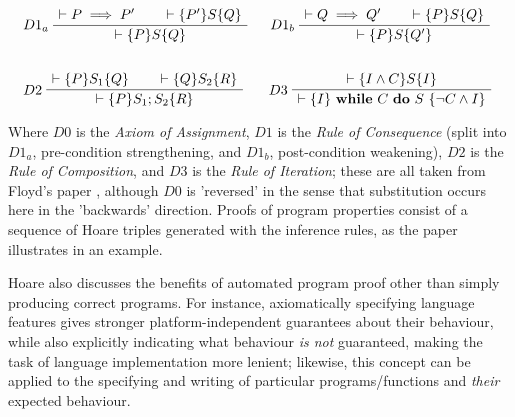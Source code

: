 \documentclass[11pt]{article}
\newenvironment{bprooftree}
  {\leavevmode\hbox\bgroup}
  {\DisplayProof\egroup}
\begin{document}
\[
    \noindent\begin{tabular}{l c r}
        \begin{bprooftree}
            \LeftLabel{$D1_a$}
            \AxiomC{$ \vdash P \implies P' $}
            \AxiomC{$ \vdash \{P'\} S \{Q\} $}
            \BinaryInfC{$ \vdash \{P\} S \{Q\} $}
        \end{bprooftree} 
        &
        \begin{bprooftree}
            \LeftLabel{$D1_b$}
            \AxiomC{$ \vdash Q \implies Q' $}
            \AxiomC{$ \vdash \{P\} S \{Q\} $}
            \BinaryInfC{$ \vdash \{P\} S \{Q'\} $}
        \end{bprooftree} 
        \\[1cm]
        \begin{bprooftree}
            \LeftLabel{$D2$}
            \AxiomC{$       \vdash \{P\} S_1 \{Q\} $}
            \AxiomC{$       \vdash \{Q\} S_2 \{R\} $}
            \BinaryInfC{$   \vdash \{P\} S_1; S_2 \{R\} $}
        \end{bprooftree} 
        &
        \begin{bprooftree}
            \LeftLabel{$D3$}
            \AxiomC{$ \vdash \{I \land C\} S \{I\} $}
            \UnaryInfC{$ \vdash \{I\} $ \textbf{while} $C$ \textbf{do} $S$ $ 
                       \{\lnot C \land I\} $}
        \end{bprooftree}
    \end{tabular}
\]

Where $D0$ is the \textit{Axiom of Assignment}, $D1$ is the \textit{Rule of
Consequence} (split into $D1_a$,  pre-condition strengthening, and $D1_b$,
post-condition weakening), $D2$ is the \textit{Rule of Composition}, and $D3$ is
the \textit{Rule of Iteration}; these are all taken from Floyd's paper
\cite{floyd1967assigning}, although $D0$ is 'reversed' in the sense that
substitution occurs here in the 'backwards' direction. Proofs of program
properties consist of a sequence of Hoare triples generated with the inference
rules, as the paper illustrates in an example.
\par
Hoare also discusses the benefits of automated program proof other than simply
producing correct programs. For instance, axiomatically specifying language
features gives stronger platform-independent guarantees about their behaviour,
while also explicitly indicating what behaviour \textit{is not} guaranteed,
making the task of language implementation more lenient; likewise, this concept
can be applied to the specifying and writing of particular programs/functions 
and \textit{their} expected behaviour. 
\end{document}
